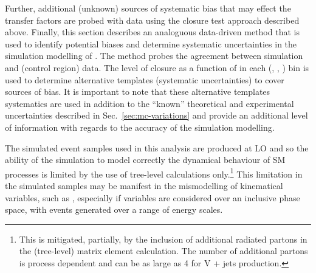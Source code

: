 Further, additional (unknown) sources of systematic bias that may
effect the transfer factors are probed with data using the closure
test approach described above. Finally, this section describes an
analoguous data-driven method that is used to identify potential
biases and determine systematic uncertainties in the simulation
modelling of \mht. The method probes the agreement between simulation
and (control region) data. The level of closure as a function of \mht
in each (\njet, \scalht, \nb) bin is used to determine alternative
templates (\ie systematic uncertainties) to cover sources of bias. It
is important to note that these alternative templates systematics are
used in addition to the ``known'' theoretical and experimental
uncertainties described in Sec.~\ref{sec:mc-variations} and provide an
additional level of information with regards to the accuracy of the
simulation modelling. 

The simulated event samples used in this analysis are produced at LO
and so the ability of the simulation to model correctly the dynamical
behaviour of SM processes is limited by the use of tree-level
calculations only.\footnote{This is mitigated, partially, by the
  inclusion of additional radiated partons in the (tree-level) matrix
  element calculation. The number of additional partons is process
  dependent and can be as large as 4 for \eg V + jets production.}
This limitation in the simulated samples may be manifest in the
mismodelling of kinematical variables, such as \HTmiss, especially if
variables are considered over an inclusive phase space, with events
generated over a range of energy scales.

